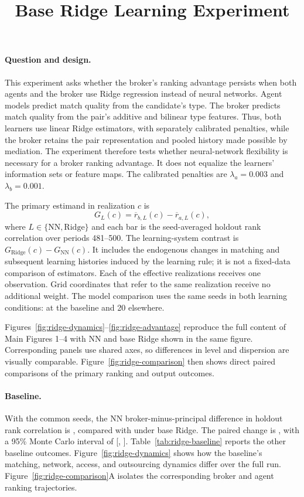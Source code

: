 \documentclass[11pt]{article}
\title{Base Ridge Learning Experiment}
\author{}
\date{}
\begin{document}
\maketitle
\renewcommand{\thefigure}{R\arabic{figure}}
\renewcommand{\thetable}{R\arabic{table}}

\paragraph{Question and design.}
This experiment asks whether the broker's ranking advantage persists when both
agents and the broker use Ridge regression instead of neural networks. Agent
models predict match quality from the candidate's type. The broker predicts
match quality from the pair's additive and bilinear type features. Thus, both
learners use linear Ridge estimators, with separately calibrated penalties,
while the broker retains the pair representation and pooled history made
possible by mediation. The experiment therefore tests whether neural-network
flexibility is necessary for a broker ranking advantage. It does not equalize
the learners' information sets or feature maps. The calibrated penalties are
$\lambda_a=0.003$ and $\lambda_b=0.001$.

The primary estimand in realization $c$ is
\[
G_L(c)=\overline{r}_{b,L}(c)-\overline{r}_{a,L}(c),
\]
where $L\in\{\mathrm{NN},\mathrm{Ridge}\}$ and each bar is the seed-averaged
holdout rank correlation over periods 481--500. The learning-system contrast is
$G_{\mathrm{Ridge}}(c)-G_{\mathrm{NN}}(c)$. It includes the endogenous changes
in matching and subsequent learning histories induced by the learning rule; it
is not a fixed-data comparison of estimators. Each of the
 effective realizations receives one observation. Grid
coordinates that refer to the same realization receive no additional weight.
The model comparison uses the same seeds in both learning conditions:
 at the baseline and 20 elsewhere.

Figures~\ref{fig:ridge-dynamics}--\ref{fig:ridge-advantage} reproduce the full
content of Main Figures 1--4 with NN and base Ridge shown in the same figure.
Corresponding panels use shared axes, so differences in level and dispersion
are visually comparable. Figure~\ref{fig:ridge-comparison} then shows direct
paired comparisons of the primary ranking and output outcomes.

\paragraph{Baseline.}
With the common seeds, the NN broker-minus-principal difference in holdout rank
correlation is
, compared with
 under base Ridge. The paired change is
, with a 95\% Monte Carlo interval of
[, ].
Table~\ref{tab:ridge-baseline} reports the other
baseline outcomes. Figure~\ref{fig:ridge-dynamics} shows how the baseline's
matching, network, access, and outsourcing dynamics differ over the full run.
Figure~\ref{fig:ridge-comparison}A isolates the corresponding broker and agent
ranking trajectories.
\end{document}
